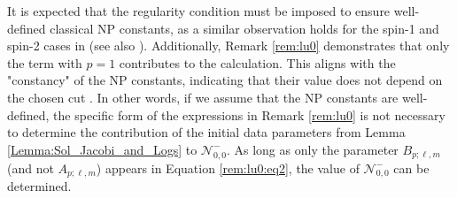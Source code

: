 It is expected that the regularity condition must be imposed to ensure well-defined classical NP constants, as a similar observation holds for the spin-1 and spin-2 cases in \cite{GasVal20} (see also \cite{Val98, Val99a}). Additionally, Remark \ref{rem:lu0} demonstrates that only the term with $p=1$ contributes to the calculation. This aligns with the "constancy" of the NP constants, indicating that their value does not depend on the chosen cut \cite{NewPen68}. In other words, if we assume that the NP constants are well-defined, the specific form of the expressions in Remark \ref{rem:lu0} is not necessary to determine the contribution of the initial data parameters from Lemma \ref{Lemma:Sol_Jacobi_and_Logs} to $\mathcal{N}^{-}_{0,0}$. As long as only the parameter $B_{p;\ell,m}$ (and not $A_{p;\ell,m}$) appears in Equation \ref{rem:lu0:eq2}, the value of $\mathcal{N}^{-}_{0,0}$ can be determined.


